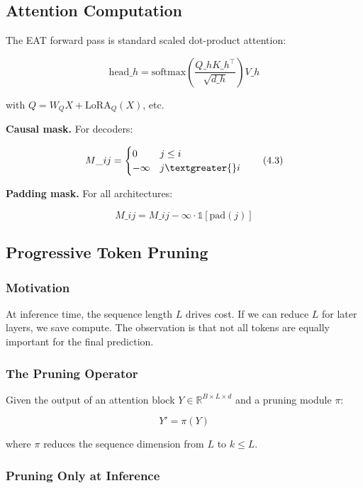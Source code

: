 \subsection{Attention Computation}

The EAT forward pass is standard scaled dot-product attention:

\[
\text{head}\_h = \text{softmax}\!\left(\frac{Q\_h K\_h^\top}{\sqrt{d\_h}}\right) V\_h
\tag{4.2}
\]

with $Q = W_Q X + \text{LoRA}_Q(X)$, etc.

\textbf{Causal mask.} For decoders:

\[
M\_{ij} = \begin{cases} 0 & j \leq i \\ -\infty & j \textgreater{} i \end{cases}
\tag{4.3}
\]

\textbf{Padding mask.} For all architectures:

\[
M\_{ij} = M\_{ij} - \infty \cdot \mathbb{1}[\text{pad}(j)]
\tag{4.4}
\]

\subsection{Progressive Token Pruning}

\subsubsection{Motivation}

At inference time, the sequence length $L$ drives cost. If we can reduce $L$ 
for later layers, we save compute. The observation is that not all tokens 
are equally important for the final prediction.

\subsubsection{The Pruning Operator}

Given the output of an attention block $Y \in \mathbb{R}^{B \times L \times d}$ 
and a pruning module $\pi$:

\[
Y' = \pi(Y)
\tag{4.5}
\]

where $\pi$ reduces the sequence dimension from $L$ to $k \leq L$.

\subsubsection{Pruning Only at Inference}

